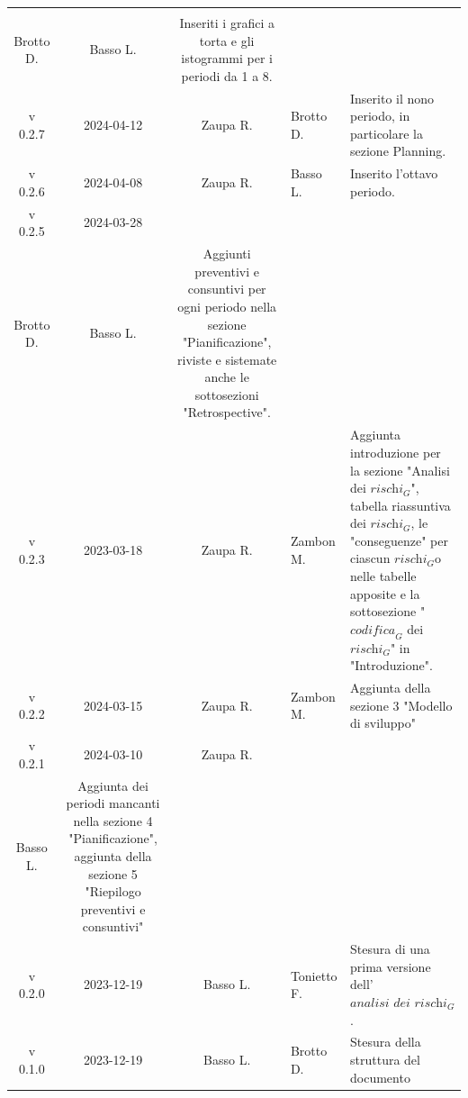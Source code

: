 \documentclass[12pt, oneside]{article}
\begin{document}
\begin{longtable}{|c|c|c|p{3cm}|p{6cm}|}
\begin{tabular}[c]{@{}c@{}}
    Zaupa R. \\
    Brotto D.
  \end{tabular} 
    & Basso L.
  & Inseriti i grafici a torta e gli istogrammi per i periodi da 1 a 8.\\
\hline
v 0.2.7 & 2024-04-12 & Zaupa R. & Brotto D. & Inserito il nono periodo, in particolare la sezione Planning.\\
\hline
v 0.2.6 & 2024-04-08 & Zaupa R. & Basso L. & Inserito l'ottavo periodo.\\
\hline
v 0.2.5 & 2024-03-28 & \begin{tabular}[c]{@{}c@{}}
    Zaupa R. \\
    Brotto D.
  \end{tabular} 
  & Basso L. & Aggiunti preventivi e consuntivi per ogni periodo nella sezione "Pianificazione", riviste e sistemate anche le sottosezioni "Retrospective".\\
\hline
v 0.2.3 & 2023-03-18 & Zaupa R. & Zambon M. & Aggiunta introduzione per la sezione "Analisi dei $\textit{rischi}_G$", tabella riassuntiva dei $\textit{rischi}_G$, le "conseguenze" per ciascun $\textit{rischi}_G$o nelle tabelle apposite e la sottosezione "$\textit{codifica}_G$ dei $\textit{rischi}_G$" in "Introduzione".\\
\hline
v 0.2.2 & 2024-03-15 & Zaupa R. & Zambon M. & Aggiunta della sezione 3 "Modello di sviluppo" \\
\hline
v 0.2.1 & 2024-03-10 & Zaupa R. & \begin{tabular}[c]{@{}c@{}}
    Zambon M. \\
    Basso L.
  \end{tabular}  & Aggiunta dei periodi mancanti nella sezione 4 "Pianificazione", aggiunta della sezione 5 "Riepilogo preventivi e consuntivi" \\
\hline
v 0.2.0 & 2023-12-19 & Basso L. & Tonietto F. & Stesura di una prima versione dell'$\textit{analisi dei rischi}_G$. \\
\hline
v 0.1.0 & 2023-12-19 & Basso L. & Brotto D. & Stesura della struttura del documento \\
\hline
\end{longtable}
\newpage


\tableofcontents
\newpage

\newpage

\newpage

\newpage

\newpage

\end{document}
